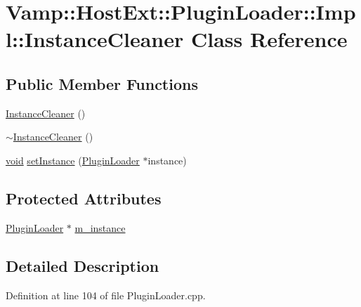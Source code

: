 \hypertarget{class_vamp_1_1_host_ext_1_1_plugin_loader_1_1_impl_1_1_instance_cleaner}{}\section{Vamp\+:\+:Host\+Ext\+:\+:Plugin\+Loader\+:\+:Impl\+:\+:Instance\+Cleaner Class Reference}
\label{class_vamp_1_1_host_ext_1_1_plugin_loader_1_1_impl_1_1_instance_cleaner}
\subsection*{Public Member Functions}
\begin{DoxyCompactItemize}
\item 
\hyperlink{class_vamp_1_1_host_ext_1_1_plugin_loader_1_1_impl_1_1_instance_cleaner_a94ae2e994b87be62dd401852fb8d49fd}{Instance\+Cleaner} ()
\item 
\hyperlink{class_vamp_1_1_host_ext_1_1_plugin_loader_1_1_impl_1_1_instance_cleaner_a246ddea5df77287755b1aaef734538bf}{$\sim$\+Instance\+Cleaner} ()
\item 
\hyperlink{sound_8c_ae35f5844602719cf66324f4de2a658b3}{void} \hyperlink{class_vamp_1_1_host_ext_1_1_plugin_loader_1_1_impl_1_1_instance_cleaner_a11edf3783377088dd757b46d9b2c9101}{set\+Instance} (\hyperlink{class_vamp_1_1_host_ext_1_1_plugin_loader}{Plugin\+Loader} $\ast$instance)
\end{DoxyCompactItemize}
\subsection*{Protected Attributes}
\begin{DoxyCompactItemize}
\item 
\hyperlink{class_vamp_1_1_host_ext_1_1_plugin_loader}{Plugin\+Loader} $\ast$ \hyperlink{class_vamp_1_1_host_ext_1_1_plugin_loader_1_1_impl_1_1_instance_cleaner_a2b6d3d267fe1754ea3dca7bb6d48fc70}{m\+\_\+instance}
\end{DoxyCompactItemize}


\subsection{Detailed Description}


Definition at line 104 of file Plugin\+Loader.\+cpp.



